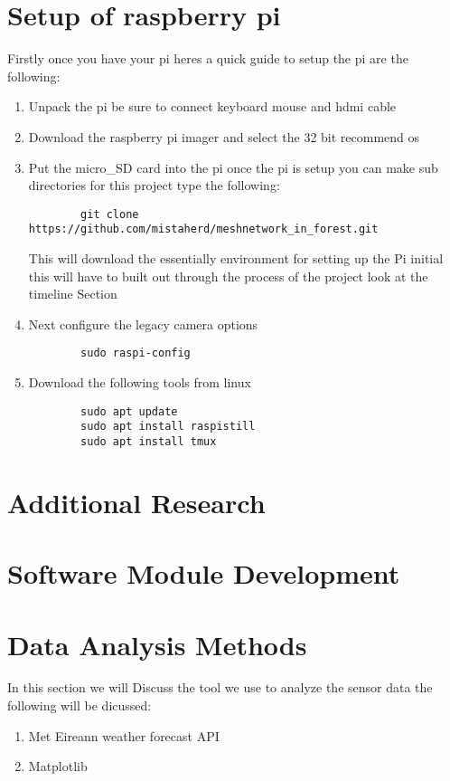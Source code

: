\section{Setup of raspberry pi}
Firstly once you have  your pi  heres  a  quick  guide to setup the pi are  the following:
\begin{enumerate}
    \item Unpack the  pi be sure  to  connect keyboard mouse  and hdmi cable
    \item Download the  raspberry pi imager and  select the  32 bit  recommend os 
    \item Put the  micro\_SD card  into  the pi once the  pi is  setup you can make sub directories for this project type the  following:
    \begin{verbatim}
        git clone https://github.com/mistaherd/meshnetwork_in_forest.git
    \end{verbatim}
    This  will download the  essentially  environment for  setting up the  Pi  initial this will have to built out  through the  process of  the   project look at the timeline Section
    \item Next configure the legacy camera  options
    \begin{verbatim}
        sudo raspi-config
    \end{verbatim}
    \item Download the following tools from linux
    \begin{verbatim}
        sudo apt update
        sudo apt install raspistill
        sudo apt install tmux
    \end{verbatim}
\end{enumerate}
\section{Additional  Research}

\section{Software Module Development}

\newpage

\section{Data Analysis Methods}
In this section we will Discuss the tool we use to analyze the sensor data the following will be dicussed:
\begin{enumerate}
    \item Met Eireann weather forecast API
    \item Matplotlib
\end{enumerate}
